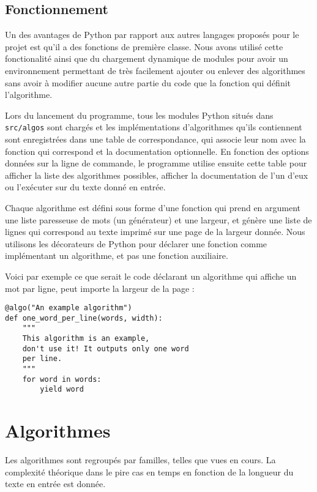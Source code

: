 \documentclass{article}
\begin{document}
\section{Fonctionnement}

Un des avantages de Python par rapport aux autres langages proposés pour le
projet est qu'il a des fonctions de première classe. Nous avons utilisé cette
fonctionalité ainsi que du chargement dynamique de modules pour avoir un
environnement permettant de très facilement ajouter ou enlever des algorithmes
sans avoir à modifier aucune autre partie du code que la fonction qui définit
l'algorithme.

Lors du lancement du programme, tous les modules Python situés dans
\verb|src/algos| sont chargés et les implémentations d'algorithmes qu'ils
contiennent sont enregistrées dans une table de correspondance, qui associe leur
nom avec la fonction qui correspond et la documentation optionnelle. En fonction
des options données sur la ligne de commande, le programme utilise ensuite cette
table pour afficher la liste des algorithmes possibles, afficher la
documentation de l'un d'eux ou l'exécuter sur du texte donné en entrée.

Chaque algorithme est défini sous forme d'une fonction qui prend en argument une
liste paresseuse de mots (un générateur) et une largeur, et génère une liste
de lignes qui correspond au texte imprimé sur une page de la largeur donnée.
Nous utilisons les décorateurs de Python pour déclarer une fonction comme
implémentant un algorithme, et pas une fonction auxiliaire.

Voici par exemple ce que serait le code déclarant un algorithme qui affiche un
mot par ligne, peut importe la largeur de la page :

\begin{verbatim}
@algo("An example algorithm")
def one_word_per_line(words, width):
    """
    This algorithm is an example,
    don't use it! It outputs only one word
    per line.
    """
    for word in words:
        yield word
\end{verbatim}

\chapter{Algorithmes}

Les algorithmes sont regroupés par familles, telles que vues en cours. La
complexité théorique dans le pire cas en temps en fonction de la longueur du
texte en entrée est donnée.
\end{document}
